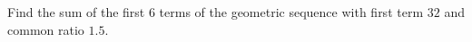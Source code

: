 Find the sum of the first $6$ terms of the geometric sequence with first term $32$ and common ratio $1.5$.
